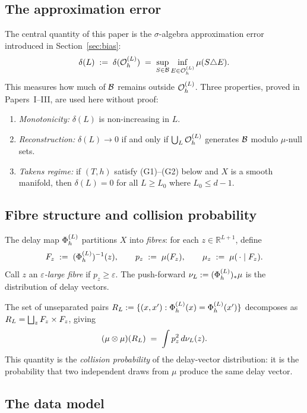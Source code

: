 \subsection{The approximation error}

The central quantity of this paper is the $\sigma$-algebra approximation error
introduced in Section~\ref{sec:bias}:
\[
  \delta(L) \;:=\; \delta(\mathcal{O}_h^{(L)}) \;=\;
  \sup_{S \in \mathcal{B}} \inf_{E \in \mathcal{O}_h^{(L)}} \mu(S \triangle E).
\]
This measures how much of $\mathcal{B}$ remains outside $\mathcal{O}_h^{(L)}$.
Three properties, proved in Papers~I--III, are used here without proof:
\begin{enumerate}[label=(\alph*)]
  \item \emph{Monotonicity:} $\delta(L)$ is non-increasing in $L$.
  \item \emph{Reconstruction:} $\delta(L) \to 0$ if and only if
    $\bigcup_L \mathcal{O}_h^{(L)}$ generates $\mathcal{B}$ modulo $\mu$-null sets.
  \item \emph{Takens regime:} if $(T,h)$ satisfy (G1)--(G2) below and $X$
    is a smooth manifold, then $\delta(L) = 0$ for all $L \geq L_0$
    where $L_0 \leq d - 1$.
\end{enumerate}

\subsection{Fibre structure and collision probability}
\label{subsec:fibres}

The delay map $\Phi_h^{(L)}$ partitions $X$ into \emph{fibres}: for each
$z \in \mathbb{R}^{L+1}$, define
\[
  F_z \;:=\; (\Phi_h^{(L)})^{-1}(z), \qquad
  p_z \;:=\; \mu(F_z), \qquad
  \mu_z \;:=\; \mu(\,\cdot\mid F_z).
\]
Call $z$ an \emph{$\varepsilon$-large fibre} if $p_z \geq \varepsilon$.
The push-forward $\nu_L := (\Phi_h^{(L)})_*\mu$ is the distribution of
delay vectors.

The set of unseparated pairs $R_L := \{(x,x') : \Phi_h^{(L)}(x) = \Phi_h^{(L)}(x')\}$
decomposes as $R_L = \bigsqcup_z F_z \times F_z$, giving
\begin{equation}
  (\mu \otimes \mu)(R_L)
  \;=\; \int p_z^2\,d\nu_L(z).
  \label{eq:collision-prob}
\end{equation}
This quantity is the \emph{collision probability} of the delay-vector
distribution: it is the probability that two independent draws from $\mu$
produce the same delay vector.

\subsection{The data model}

